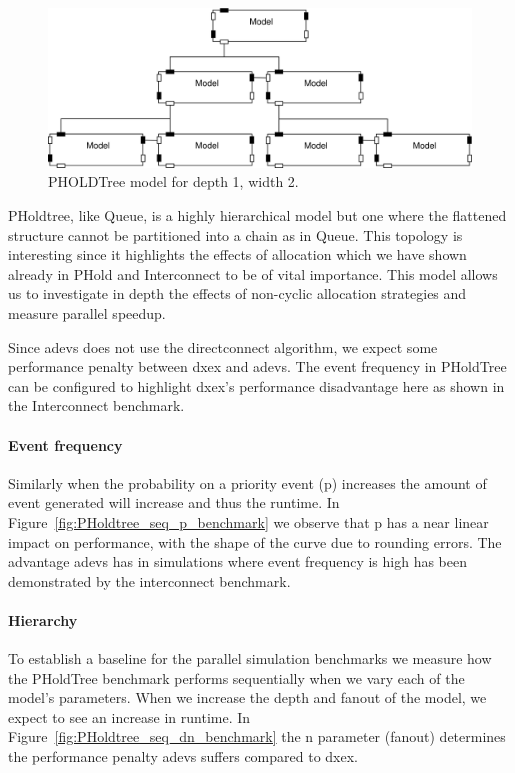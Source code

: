 \begin{figure}
\includegraphics[width=\modelfraction\columnwidth]{fig/pholdtree.pdf}
\caption{PHOLDTree model for depth 1, width 2.}
\label{fig:PHOLDTree_model}
\end{figure}

PHoldtree, like Queue, is a highly hierarchical model but one where the flattened structure cannot be partitioned into a chain as in Queue.
This topology is interesting since it highlights the effects of allocation which we have shown already in PHold and Interconnect to be of vital importance.
This model allows us to investigate in depth the effects of non-cyclic allocation strategies and measure parallel speedup.

Since adevs does not use the directconnect algorithm, we expect some performance penalty between dxex and adevs.
The event frequency in PHoldTree can be configured to highlight dxex's performance disadvantage here as shown in the Interconnect benchmark.

\paragraph*{Event frequency}
Similarly when the probability on a priority event (p) increases the amount of event generated will increase and thus the runtime.
In Figure~\ref{fig:PHoldtree_seq_p_benchmark} we observe that p has a near linear impact on performance, with the shape of the curve due to rounding errors.
The advantage adevs has in simulations where event frequency is high has been demonstrated by the interconnect benchmark.

\paragraph*{Hierarchy}
To establish a baseline for the parallel simulation benchmarks we measure how the PHoldTree benchmark performs sequentially when we vary each of the model's parameters.
When we increase the depth and fanout of the model, we expect to see an increase in runtime.
In Figure~\ref{fig:PHoldtree_seq_dn_benchmark} the n parameter (fanout) determines the performance penalty adevs suffers compared to dxex.

